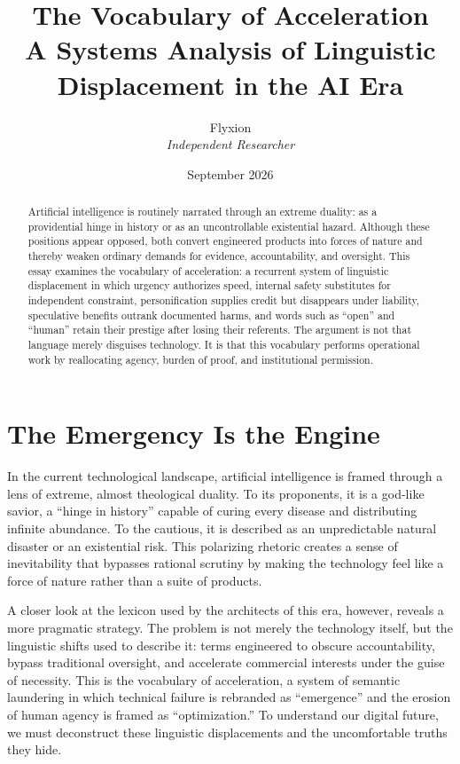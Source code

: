 \documentclass[11pt]{article}
\title{\textbf{The Vocabulary of Acceleration}\\[0.35em]
\large A Systems Analysis of Linguistic Displacement in the AI Era}
\author{Flyxion\\\textit{Independent Researcher}}
\date{September 2026}
\begin{document}
\maketitle

\begin{abstract}
Artificial intelligence is routinely narrated through an extreme duality: as a providential hinge in history or as an uncontrollable existential hazard. Although these positions appear opposed, both convert engineered products into forces of nature and thereby weaken ordinary demands for evidence, accountability, and oversight. This essay examines the vocabulary of acceleration: a recurrent system of linguistic displacement in which urgency authorizes speed, internal safety substitutes for independent constraint, personification supplies credit but disappears under liability, speculative benefits outrank documented harms, and words such as \enquote{open} and \enquote{human} retain their prestige after losing their referents. The argument is not that language merely disguises technology. It is that this vocabulary performs operational work by reallocating agency, burden of proof, and institutional permission.
\end{abstract}

\section{The Emergency Is the Engine}

In the current technological landscape, artificial intelligence is framed through a lens of extreme, almost theological duality. To its proponents, it is a god-like savior, a \enquote{hinge in history} capable of curing every disease and distributing infinite abundance. To the cautious, it is described as an unpredictable natural disaster or an existential risk. This polarizing rhetoric creates a sense of inevitability that bypasses rational scrutiny by making the technology feel like a force of nature rather than a suite of products.

A closer look at the lexicon used by the architects of this era, however, reveals a more pragmatic strategy. The problem is not merely the technology itself, but the linguistic shifts used to describe it: terms engineered to obscure accountability, bypass traditional oversight, and accelerate commercial interests under the guise of necessity. This is the vocabulary of acceleration, a system of semantic laundering in which technical failure is rebranded as \enquote{emergence} and the erosion of human agency is framed as \enquote{optimization.} To understand our digital future, we must deconstruct these linguistic displacements and the uncomfortable truths they hide.
\end{document}

